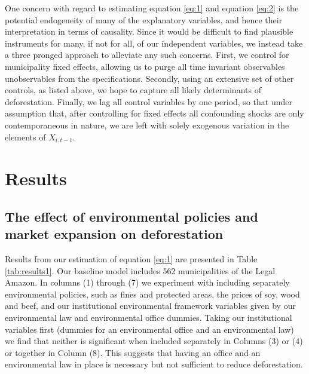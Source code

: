 One concern with regard to estimating equation \ref{eq:1} and equation \ref{eq:2} is the potential endogeneity of many of the explanatory variables, and hence their interpretation in terms of causality.  Since it would be difficult to find plausible instruments for many, if not for all, of our independent variables, we instead take a three pronged approach to alleviate any such concerns.  First, we control for municipality fixed effects, allowing us to purge all time invariant observables unobservables from the specifications.  Secondly, using an extensive set of other controls, as listed above, we hope to capture all likely determinants of deforestation.  Finally, we lag all control variables by one period, so that under assumption that, after controlling for fixed effects all confounding shocks are only contemporaneous in nature, we are left with solely exogenous variation in the elements of $X_{i,t-1}$.


\section{Results}
\label{S:4}

\subsection{The effect of environmental policies and market expansion on deforestation}

Results from our estimation of equation \ref{eq:1} are presented in Table \ref{tab:results1}. Our baseline model includes 562 municipalities of the Legal Amazon. In columns (1) through (7) we experiment with including separately environmental policies, such as fines and protected areas, the prices of soy, wood and beef, and our institutional environmental framework variables given by our environmental law and environmental office dummies. Taking our institutional variables first (dummies for an environmental office and an environmental law) we find that neither is significant when included separately in Columns (3) or (4) or together in Column (8). This suggests that having an office and an environmental law in place is necessary but not sufficient to reduce deforestation.

